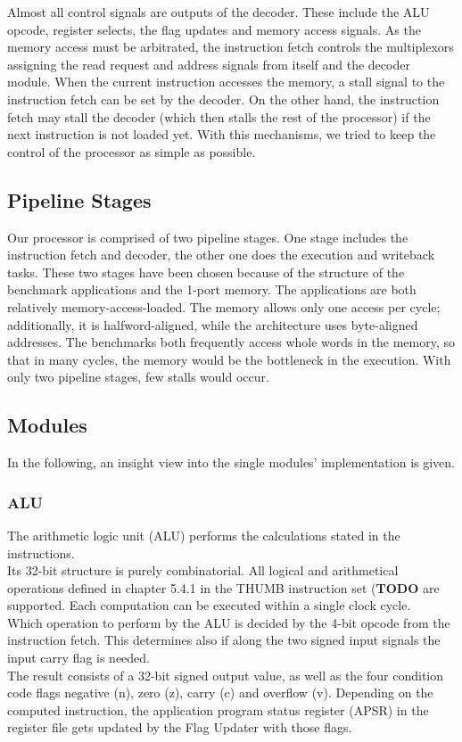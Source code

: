 Almost all control signals are outputs of the decoder. These include the ALU opcode, register selects, the flag updates and memory access signals. As the memory access must be arbitrated, the instruction fetch controls the multiplexors assigning the read request and address signals from itself and the decoder module. When the current instruction accesses the memory, a stall signal to the instruction fetch can be set by the decoder. On the other hand, the instruction fetch may stall the decoder (which then stalls the rest of the processor) if the next instruction is not loaded yet. With this mechanisms, we tried to keep the control of the processor as simple as possible.

\subsection{Pipeline Stages}
\label{subsec:pipelinestages}

Our processor is comprised of two pipeline stages. One stage includes the instruction fetch and decoder, the other one does the execution and writeback tasks. These two stages have been chosen because of the structure of the benchmark applications and the 1-port memory. The applications are both relatively memory-access-loaded. The memory allows only one access per cycle; additionally, it is halfword-aligned, while the architecture uses byte-aligned addresses. The benchmarks both frequently access whole words in the memory, so that in many cycles, the memory would be the bottleneck in the execution. With only two pipeline stages, few stalls would occur. 

\subsection{Modules}
\label{subsec:modules}
In the following, an insight view into the single modules' implementation is given.

\subsubsection{ALU}
\label{subsubsec:alu}
The arithmetic logic unit (ALU) performs the calculations stated in the instructions.\\
Its 32-bit structure is purely combinatorial. All logical and arithmetical operations defined in chapter 5.4.1 in the THUMB instruction set (\textbf{TODO} are supported. Each computation can be executed within a single clock cycle.\\
\newline
Which operation to perform by the ALU is decided by the 4-bit opcode from the instruction fetch. This determines also if along the two signed input signals the input carry flag is needed.\\
The result consists of a 32-bit signed output value, as well as the four condition code flags negative (n), zero (z), carry (c) and overflow (v). Depending on the computed instruction, the application program status register (APSR) in the register file gets updated by the Flag Updater with those flags.


